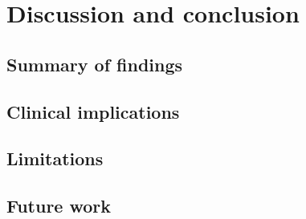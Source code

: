 \chapter{Discussion and conclusion}
\label{ch:discussion}


\section{Summary of findings}

\section{Clinical implications}

\section{Limitations}

\section{Future work}
\label{sec:future-cross-dataset}

